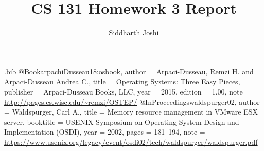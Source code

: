 \usepackage{filecontents}

\begin{filecontents}{\jobname.bib}
@Book{arpachiDusseau18:osbook,
  author =       {Arpaci-Dusseau, Remzi H. and Arpaci-Dusseau Andrea C.},
  title =        {Operating Systems: Three Easy Pieces},
  publisher =    {Arpaci-Dusseau Books, LLC},
  year =         2015,
  edition =      {1.00},
  note =         {\url{http://pages.cs.wisc.edu/~remzi/OSTEP/}}
}
@InProceedings{waldspurger02,
  author =       {Waldspurger, Carl A.},
  title =        {Memory resource management in {VMware ESX} server},
  booktitle =    {USENIX Symposium on Operating System Design and
                  Implementation (OSDI)},
  year =         2002,
  pages =        {181--194},
  note =         {\url{https://www.usenix.org/legacy/event/osdi02/tech/waldspurger/waldspurger.pdf}}}
\end{filecontents}



\date{}

\title{\Large \bf CS 131 Homework 3 Report}

\author{
{\rm Siddharth Joshi}\\
} %

\maketitle

